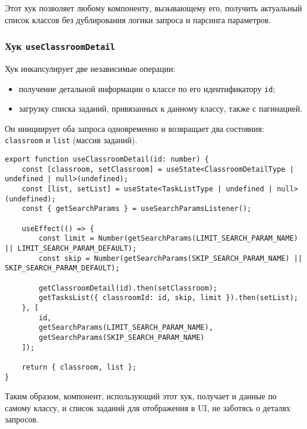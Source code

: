 Этот хук позволяет любому компоненту, вызывающему его, получить актуальный список классов без дублирования логики запроса и парсинга параметров.

\subsubsection{Хук \texttt{useClassroomDetail}}
Хук инкапсулирует две независимые операции:
\begin{itemize}
  \item получение детальной информации о классе по его идентификатору \texttt{id};
  \item загрузку списка заданий, привязанных к данному классу, также с пагинацией.
\end{itemize}
Он инициирует оба запроса одновременно и возвращает два состояния: \texttt{classroom} и \texttt{list} (массив заданий).
\begin{lstlisting}[caption={Кастомный хук useClassroomDetail}, label={lst:useClassroomDetail}]
export function useClassroomDetail(id: number) {
    const [classroom, setClassroom] = useState<ClassroomDetailType | undefined | null>(undefined);
    const [list, setList] = useState<TaskListType | undefined | null>(undefined);
    const { getSearchParams } = useSearchParamsListener();

    useEffect(() => {
        const limit = Number(getSearchParams(LIMIT_SEARCH_PARAM_NAME) || LIMIT_SEARCH_PARAM_DEFAULT);
        const skip = Number(getSearchParams(SKIP_SEARCH_PARAM_NAME) || SKIP_SEARCH_PARAM_DEFAULT);

        getClassroomDetail(id).then(setClassroom);
        getTasksList({ classroomId: id, skip, limit }).then(setList);
    }, [
        id,
        getSearchParams(LIMIT_SEARCH_PARAM_NAME),
        getSearchParams(SKIP_SEARCH_PARAM_NAME)
    ]);

    return { classroom, list };
}
\end{lstlisting}

Таким образом, компонент, использующий этот хук, получает и данные по самому классу, и список заданий для отображения в UI, не заботясь о деталях запросов.

